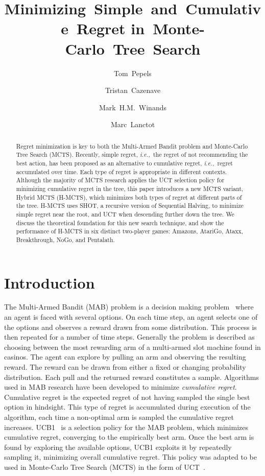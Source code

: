 \documentclass[a4paper]{llncs}
\title{Minimizing~Simple~and~Cumulative~Regret in~Monte-Carlo~Tree~Search}
\author{Tom~Pepels\inst{1} \and Tristan~Cazenave\inst{2} \and
Mark~H.M.~Winands\inst{1} \and Marc~Lanctot\inst{1}}
\institute{Department of Knowledge Engineering,  Maastricht University\\ \email{\{tom.pepels,m.winands,marc.lanctot\}@maastrichtuniversity.nl} \and LAMSADE - Université Paris-Dauphine \\ \email{cazenave@lamsade.dauphine.fr}}
\newcommand{\ie}{{\it i.e.,}~}
\begin{document}
\maketitle

\begin{abstract} Regret minimization is key to both the Multi-Armed Bandit problem and Monte-Carlo Tree Search (MCTS). Recently, simple regret, \ie the regret of not recommending the best action, has been proposed as an alternative to cumulative regret, \ie regret accumulated over time. Each type of regret is appropriate in different contexts. Although the majority of MCTS research applies the UCT selection policy for minimizing cumulative regret in the tree, this paper introduces a new MCTS variant, Hybrid MCTS (H-MCTS), which minimizes both types of regret at different parts of the tree. H-MCTS uses SHOT, a recursive version of Sequential Halving,  to minimize simple regret near the root, and UCT when descending further down the tree. We discuss the theoretical foundation for this new search technique, and show the performance of H-MCTS in six distinct two-player games: Amazons, AtariGo, Ataxx, Breakthrough, NoGo, and Pentalath.

\end{abstract}

\section{Introduction}
\label{sec:intro}

The Multi-Armed Bandit (MAB) problem is a decision making problem~\cite{auer2002using} where an agent is faced with several options. On each time step, an agent selects one of the options and observes a reward drawn from some distribution. This process is then repeated for a number of time steps.
Generally the problem is described as choosing between the most rewarding arm of a multi-armed slot machine found in casinos. The agent can explore by pulling an arm and observing the resulting reward. The reward can be drawn from either a fixed or changing probability distribution. Each pull and the returned reward constitutes a sample. Algorithms used in MAB research have been developed to minimize \emph{cumulative regret}. Cumulative regret is the expected regret of not having sampled the single best option in hindsight. This type of regret is accumulated during execution of the algorithm, each time a non-optimal arm is sampled the cumulative regret increases. UCB1~\cite{auer2002using} is a selection policy for the MAB problem, which minimizes cumulative regret, converging to the empirically best arm. Once the best arm is found by exploring the available options, UCB1 exploits it by repeatedly sampling it, minimizing overall cumulative regret. This policy was adapted to be used in Monte-Carlo Tree Search (MCTS) in the form of UCT~\cite{kocsis2006bandit}.
\end{document}
